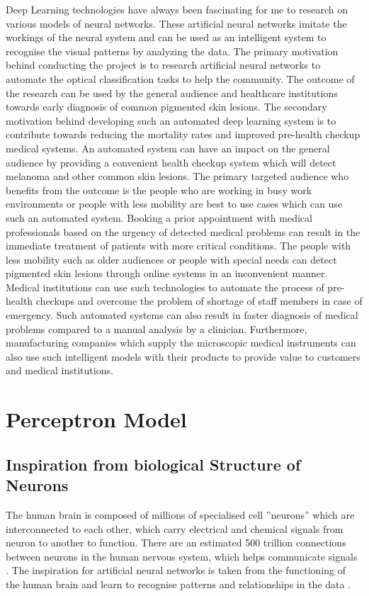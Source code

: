 Deep Learning technologies have always been fascinating for me to research on various models of neural networks. These artificial neural networks imitate the workings of the neural system and can be used as an intelligent system to recognise the visual patterns by analyzing the data. The primary motivation behind conducting the project is to research artificial neural networks to automate the optical classification tasks to help the community. The outcome of the research can be used by the general audience and healthcare institutions towards early diagnosis of common pigmented skin lesions. The secondary motivation behind developing such an automated deep learning system is to contribute towards reducing the mortality rates and improved pre-health checkup medical systems. An automated system can have an impact on the general audience by providing a convenient health checkup system which will detect melanoma and other common skin lesions.
The primary targeted audience who benefits from the outcome is the people who are working in busy work environments or people with less mobility are best to use cases which can use such an automated system. Booking a prior appointment with medical professionals based on the urgency of detected medical problems can result in the immediate treatment of patients with more critical conditions. The people with less mobility such as older audiences or people with special needs can detect pigmented skin lesions through online systems in an inconvenient manner. Medical institutions can use such technologies to automate the process of pre-health checkups and overcome the problem of shortage of staff members in case of emergency. Such automated systems can also result in faster diagnosis of medical problems compared to a manual analysis by a clinician. Furthermore, manufacturing companies which supply the microscopic medical instruments can also use such intelligent models with their products to provide value to customers and medical institutions. 

\pagebreak

\section{Perceptron Model}
\subsection{Inspiration from biological Structure of Neurons}
The human brain is composed of millions of specialised cell ”neurons” which are interconnected to each other, which carry electrical and chemical signals from neuron to another to function. 
There are an estimated 500 trillion connections between neurons in the human nervous system, which helps communicate signals \citep{patterson2017deep}.
The inspiration for artificial neural networks is taken from the functioning of the human brain and learn to recognise patterns and relationships in the data \citep{AGATONOVICKUSTRIN2000717}. 
